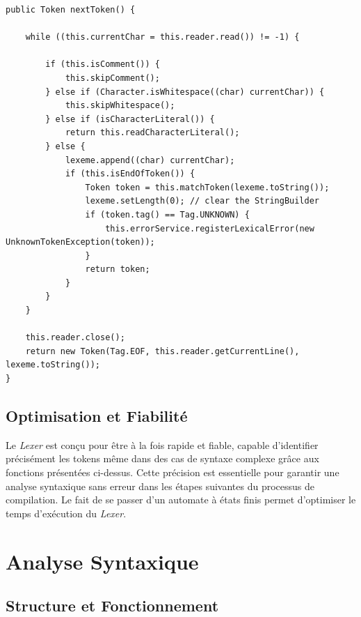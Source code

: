 \documentclass[french,a4paper]{article}
\begin{document}
    \begin{lstlisting}[label={lst:lstlisting12}]
public Token nextToken() {

    while ((this.currentChar = this.reader.read()) != -1) {

        if (this.isComment()) {
            this.skipComment();
        } else if (Character.isWhitespace((char) currentChar)) {
            this.skipWhitespace();
        } else if (isCharacterLiteral()) {
            return this.readCharacterLiteral();
        } else {
            lexeme.append((char) currentChar);
            if (this.isEndOfToken()) {
                Token token = this.matchToken(lexeme.toString());
                lexeme.setLength(0); // clear the StringBuilder
                if (token.tag() == Tag.UNKNOWN) {
                    this.errorService.registerLexicalError(new UnknownTokenException(token));
                }
                return token;
            }
        }
    }

    this.reader.close();
    return new Token(Tag.EOF, this.reader.getCurrentLine(), lexeme.toString());
}
    \end{lstlisting}

    \subsection{Optimisation et Fiabilité}\label{subsec:optimisation-et-fiabilite}

    Le \textit{Lexer} est conçu pour être à la fois rapide et fiable, capable d'identifier précisément les tokens même dans des cas de syntaxe complexe grâce aux fonctions présentées ci-dessus.
    Cette précision est essentielle pour garantir une analyse syntaxique sans erreur dans les étapes suivantes du processus de compilation.
    Le fait de se passer d'un automate à états finis permet d'optimiser le temps d'exécution du \textit{Lexer}.

    \section{Analyse Syntaxique}\label{sec:analyse-syntaxique}

    \subsection{Structure et Fonctionnement}\label{subsec:structure-et-fonctionnement}
\end{document}
